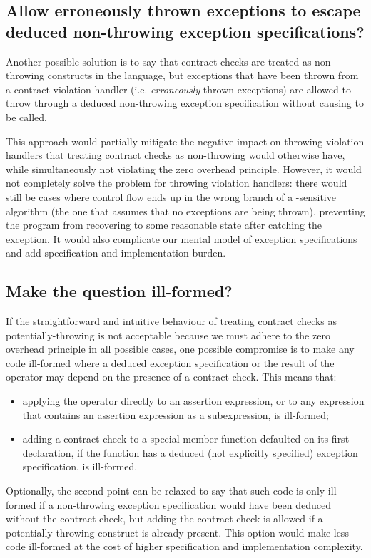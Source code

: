 \subsection{Allow erroneously thrown exceptions to escape deduced non-throwing exception specifications?}

Another possible solution is to say that contract checks are treated as non-throwing constructs in the language, but exceptions that have been thrown from a contract-violation handler (i.e. \emph{erroneously} thrown exceptions) are allowed to throw through a deduced non-throwing exception specification without causing  to be called.

This approach would partially mitigate the negative impact on throwing violation handlers that treating contract checks as non-throwing would otherwise have, while simultaneously not violating the zero overhead principle. However, it would not completely solve the problem for throwing violation handlers: there would still be cases where control flow ends up in the wrong branch of a -sensitive algorithm (the one that assumes that no exceptions are being thrown), preventing the program from recovering to some reasonable state after catching the exception. It would also complicate our mental model of exception specifications and add specification and implementation burden.

\subsection{Make the question ill-formed?}

If the straightforward and intuitive behaviour of treating contract checks as potentially-throwing is not acceptable because we must adhere to the zero overhead principle in all possible cases, one possible compromise is to make any code ill-formed where a deduced exception specification or the result of the  operator may depend on the presence of a contract check. This means that:
\begin{itemize}
\item applying the  operator directly to an assertion expression, or to any expression that contains an assertion expression as a subexpression, is ill-formed;
\item adding a contract check to a special member function defaulted on its first declaration, if the function has a deduced (not explicitly specified) exception specification, is ill-formed.
\end{itemize}
Optionally, the second point can be relaxed to say that such code is only ill-formed if a non-throwing exception specification would have been deduced without the contract check, but adding the contract check is allowed if a potentially-throwing construct is already present. This option would make less code ill-formed at the cost of higher specification and implementation complexity.

